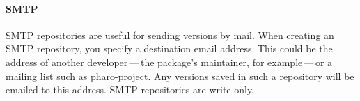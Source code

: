 \documentclass[a4paper,10pt,twoside]{book}
\begin{document}
\paragraph{SMTP} SMTP repositories are useful for sending versions by mail. When creating an SMTP repository, you specify a destination email address. This could be the address of another developer\,---\,the package's maintainer, for example\,---\,or a mailing list such as pharo-project. Any versions saved in such a repository will be emailed to this address.  SMTP repositories are write-only.






\end{document}
